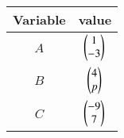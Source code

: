\begin{tabular}[12pt]{ |c| c|}
    \hline
    \textbf{Variable} & \textbf{value}\\ 
    \hline
    \textbf{$A$} & $\begin{pmatrix}1\\-3\end{pmatrix}$\\
    \hline
 \textbf{$B$} & $\begin{pmatrix}4\\p\end{pmatrix}$\\
    \hline
 \textbf{$C$} & $\begin{pmatrix}-9\\7\end{pmatrix}$\\
    \hline
    \end{tabular}